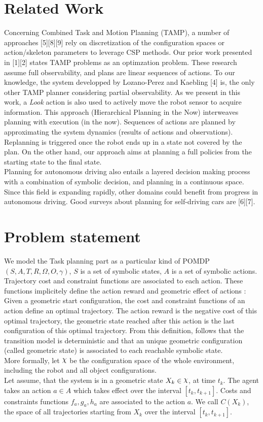 \documentclass[conference]{IEEEtran}
\DeclareRobustCommand{\rchi}{{\mathpalette\irchi\relax}}
\newcommand{\irchi}[2]{\raisebox{\depth}{$#1\chi$}} %
\begin{document}
\section{Related Work}
Concerning Combined Task and Motion Planning
(TAMP), a number of approaches [5][8][9] rely on
discretization of the configuration spaces or action/skeleton parameters to leverage CSP methods. Our prior work presented in [1][2] states TAMP problems as an optimzation problem. These research assume full observability, and plans are linear sequences of actions. To our knowledge, the system developped by Lozano-Perez and Kaebling [4] is, the only other TAMP planner considering partial observability. As we present in this work, a \textit{Look} action is also used to actively move the robot sensor to acquire information. This approach (Hierarchical Planning in the Now) interweaves planning with execution (in the now). Sequences of actions are planned by approximating the system dynamics (results of actions and observations). Replanning is triggered once the robot ends up in a state not covered by the plan. On the other hand, our approach aims at planning a full policies from the starting state to the final state. \\
Planning for autonomous driving also entails a layered decision making process with a combination of symbolic decision, and planning in a continuous space. Since this field is expanding rapidly, other domains could benefit from progress in autonomous driving. Good surveys about planning for self-driving cars are [6][7].

\section{Problem statement}
We model the Task planning part as a particular kind of POMDP $(S, A, T, R, \Omega, O, \gamma)$, $S$ is a set of symbolic states, $A$ is a set of symbolic actions. Trajectory cost and constraint functions are associated to each action. These functions implicitely define the action reward and geometric effect of actions : Given a geometric start configuration, the cost and constraint functions of an action define an optimal trajectory. The action reward is the negative cost of this optimal trajectory, the geometric state reached after this action is the last configuration of this optimal trajectory.
From this definition, follows that the transition model is deterministic and that an unique geometric configuration (called geometric state) is associated to each reachable symbolic state.\\
More formally, let $\rchi$ be the configuration space of the whole environment, including the robot and all object configurations.
\\
Let assume, that the system is in a geometric state $X_k \in \rchi $, at time $t_k$. The agent takes an action $a \in A$ which takes effect over the interval $[t_k, t_{k+1}]$. Costs and constraints functions $f_a, g_a, h_a$ are associated to the action $a$. We call $C(X_k)$, the space of all trajectories starting from $X_k$ over the interval $[t_k, t_{k+1}]$.
\end{document}
